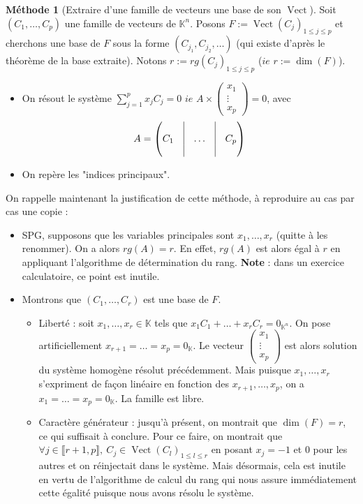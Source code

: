 \documentclass[french]{book}
\newcommand{\C}{\mathbb{C}}
\newcommand{\K}{\mathbb{K}}
\theoremstyle{plain}
\theoremstyle{definition}
\newtheorem{met}{Méthode}[chapter]
\theoremstyle{remark}
\DeclareMathOperator{\vect}{Vect}
\begin{document}
\begin{met}[Extraire d'une famille de vecteurs une base de son $\vect$]
	Soit $(C_1,\ldots,C_p)$ une famille de vecteurs de $\K^n$. Posons $F:=\vect(C_j)_{1\leqslant j\leqslant p}$ et cherchons une base de $F$ sous la forme $(C_{j_1},C_{j_2},\ldots)$ (qui existe d'après le théorème de la base extraite). Notons $r:=rg(C_j)_{1\leqslant j\leqslant p}$ ($ie$ $r:=\dim(F)$).
	\begin{itemize}
		\item On résout le système $\displaystyle\sum_{j=1}^{p}x_jC_j=0$ $ie$ $\displaystyle A\times\begin{pmatrix}x_1\\ \vdots \\ x_p\end{pmatrix}=0$, avec $$A=\begin{pmatrix}&\vline&&\vline&\\C_1&\vline&\ldots&\vline&C_p\\&\vline&&\vline&\end{pmatrix}$$
		\item On repère les "indices principaux".
	\end{itemize}
	On rappelle maintenant la justification de cette méthode, à reproduire au cas par cas une copie :
	\begin{itemize}
		\item SPG, supposons que les variables principales sont $x_1,\ldots,x_r$ (quitte à les renommer). On a alors $rg(A)=r$. En effet, $rg(A)$ est alors égal à $r$ en appliquant l'algorithme de détermination du rang. \textbf{Note} : dans un exercice calculatoire, ce point est inutile.
		\item Montrons que $(C_1,\ldots,C_r)$ est une base de $F$.
		\begin{itemize}
			\item[--] Liberté : soit $x_1,\ldots,x_r\in\K$ tels que $x_1C_1+\ldots+x_rC_r=0_{\K^n}$. On pose artificiellement $x_{r+1}=\ldots=x_p=0_\K$. Le vecteur $\displaystyle\begin{pmatrix}x_1\\ \vdots\\ x_p\end{pmatrix}$ est alors solution du système homogène résolut précédemment. Mais puisque $x_1,\ldots,x_r$ s'expriment de façon linéaire en fonction des $x_{r+1},\ldots,x_p$, on a $x_1=\ldots=x_p=0_\K$. La famille est libre.
			\item[--] Caractère générateur : jusqu'à présent, on montrait que $\dim(F)=r$, ce qui suffisait à conclure. Pour ce faire, on montrait que $\forall j\in\llbracket r+1,p\rrbracket,\ C_j\in \vect(C_l)_{1\leqslant l\leqslant r}$ en posant $x_j=-1$ et $0$ pour les autres et on réinjectait dans le système. Mais désormais, cela est inutile en vertu de l'algorithme de calcul du rang qui nous assure immédiatement cette égalité puisque nous avons résolu le système.
		\end{itemize}
	\end{itemize}
\end{met}
\end{document}
